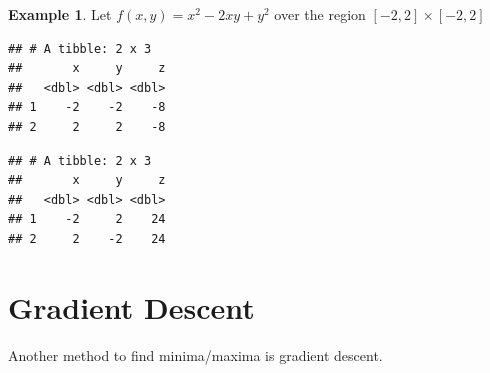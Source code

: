 \documentclass[
]{book}
\newenvironment{Shaded}{\begin{snugshade}}{\end{snugshade}}
\newcommand{\CommentTok}[1]{\textcolor[rgb]{0.56,0.35,0.01}{\textit{#1}}}
\newcommand{\ControlFlowTok}[1]{\textcolor[rgb]{0.13,0.29,0.53}{\textbf{#1}}}
\newcommand{\DataTypeTok}[1]{\textcolor[rgb]{0.13,0.29,0.53}{#1}}
\newcommand{\DecValTok}[1]{\textcolor[rgb]{0.00,0.00,0.81}{#1}}
\newcommand{\KeywordTok}[1]{\textcolor[rgb]{0.13,0.29,0.53}{\textbf{#1}}}
\newcommand{\NormalTok}[1]{#1}
\newcommand{\OperatorTok}[1]{\textcolor[rgb]{0.81,0.36,0.00}{\textbf{#1}}}
\newcommand{\StringTok}[1]{\textcolor[rgb]{0.31,0.60,0.02}{#1}}
\theoremstyle{definition}
\theoremstyle{definition}
\newtheorem{example}{Example}[chapter]
\theoremstyle{definition}
\theoremstyle{definition}
\theoremstyle{remark}
\begin{document}
\begin{example}

Let \(f(x, y) = x^2 - 2xy + y^2\) over the region \([-2,2]\times[-2, 2]\)

\begin{Shaded}
\end{Shaded}

\begin{verbatim}
## # A tibble: 2 x 3
##       x     y     z
##   <dbl> <dbl> <dbl>
## 1    -2    -2    -8
## 2     2     2    -8
\end{verbatim}

\begin{Shaded}
\end{Shaded}

\begin{verbatim}
## # A tibble: 2 x 3
##       x     y     z
##   <dbl> <dbl> <dbl>
## 1    -2     2    24
## 2     2    -2    24
\end{verbatim}

\end{example}

\hypertarget{gradient-descent}{%
\section{Gradient Descent}\label{gradient-descent}}

Another method to find minima/maxima is gradient descent.

  
\end{document}
